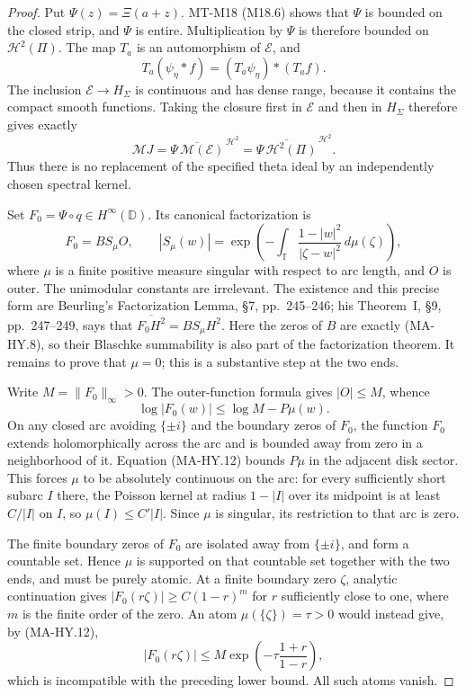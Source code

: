 \begin{proof}
Put $\Psi(z)=\Xi(a+z)$.  MT-M18 (M18.6) shows that $\Psi$ is
bounded on the closed strip, and $\Psi$ is entire.  Multiplication
by $\Psi$ is therefore bounded on $\mathscr H^2(\Pi)$.
The map $T_a$ is an automorphism of $\mathcal E$, and
\[
       T_a(\psi_\eta*f)=(T_a\psi_\eta)*(T_af).
\]
The inclusion $\mathcal E\to H_\Sigma$ is continuous and has
dense range, because it contains the compact smooth functions.
Taking the closure first in $\mathcal E$ and then in $H_\Sigma$
therefore gives exactly
\[
 \mathcal M J
     =\overline{\Psi\,\mathcal M(\mathcal E)}^{\,\mathscr H^2}
     =\overline{\Psi\,\mathscr H^2(\Pi)}^{\,\mathscr H^2}.
 \tag{MA-HY.10}
\]
Thus there is no replacement of the specified theta ideal by
an independently chosen spectral kernel.

Set $F_0=\Psi\circ q\in H^\infty(\mathbb D)$.
Its canonical factorization is
\[
       F_0=B S_\mu O,\qquad
 |S_\mu(w)|=\exp\left(-\int_{\mathbb T}
              \frac{1-|w|^2}{|\zeta-w|^2}\,d\mu(\zeta)\right),
 \tag{MA-HY.11}
\]
where $\mu$ is a finite positive measure singular with respect
to arc length, and $O$ is outer.  The unimodular constants are
irrelevant.  The existence and this precise form are Beurling's
Factorization Lemma, \S7, pp.~245--246; his Theorem~I, \S9,
pp.~247--249, says that
$\overline{F_0H^2}=B S_\mu H^2$.  Here the zeros of $B$
are exactly (MA-HY.8), so their Blaschke summability is also
part of the factorization theorem.  It remains to prove
that $\mu=0$; this is a substantive step at the two ends.

Write $M=\|F_0\|_\infty>0$.  The outer-function formula gives
$|O|\le M$, whence
\[
           \log|F_0(w)|\le\log M-P\mu(w).
 \tag{MA-HY.12}
\]
On any closed arc avoiding $\{\pm i\}$ and the boundary zeros
of $F_0$, the function $F_0$ extends holomorphically across the
arc and is bounded away from zero in a neighborhood of it.
Equation (MA-HY.12) bounds $P\mu$ in the adjacent disk sector.
This forces $\mu$ to be absolutely continuous on the arc:
for every sufficiently short subarc $I$ there, the Poisson
kernel at radius $1-|I|$ over its midpoint is at least
$C/|I|$ on $I$, so $\mu(I)\le C'|I|$.  Since $\mu$ is
singular, its restriction to that arc is zero.

The finite boundary zeros of $F_0$ are isolated away from
$\{\pm i\}$, and form a countable set.  Hence $\mu$ is
supported on that countable set together with the two ends,
and must be purely atomic.  At a finite boundary zero
$\zeta$, analytic continuation gives
$|F_0(r\zeta)|\ge C(1-r)^m$ for $r$ sufficiently close to one,
where $m$ is the finite order of the zero.  An atom
$\mu(\{\zeta\})=\tau>0$ would instead give, by (MA-HY.12),
\[
       |F_0(r\zeta)|\le M
                 \exp\left(-\tau\frac{1+r}{1-r}\right),
\]
which is incompatible with the preceding lower bound.
All such atoms vanish.


\end{proof}
